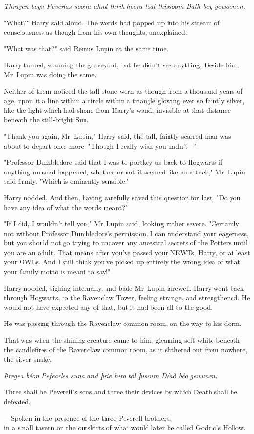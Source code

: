\emph{Thrayen beyn Peverlas soona ahnd thrih heera toal thissoom Dath bey
yewoonen.}

"What?" Harry said aloud. The words had popped up into his stream of
consciousness as though from his own thoughts, unexplained.

"What was that?" said Remus Lupin at the same time.

Harry turned, scanning the graveyard, but he didn't see anything. Beside him,
Mr~Lupin was doing the same.

Neither of them noticed the tall stone worn as though from a thousand years of
age, upon it a line within a circle within a triangle glowing ever so faintly
silver, like the light which had shone from Harry's wand, invisible at that
distance beneath the still-bright Sun.

"Thank you again, Mr~Lupin," Harry said, the tall, faintly scarred man was
about to depart once more. "Though I really wish you hadn't---"

"Professor Dumbledore said that I was to portkey us back to Hogwarts if
anything unusual happened, whether or not it seemed like an attack," Mr~Lupin
said firmly. "Which is eminently sensible."

Harry nodded. And then, having carefully saved this question for last, "Do you
have any idea of what the words meant?"

"If I did, I wouldn't tell you," Mr~Lupin said, looking rather severe.
"Certainly not without Professor Dumbledore's permission. I can understand your
eagerness, but you should not go trying to uncover any ancestral secrets of the
Potters until you are an adult. That means after you've passed your NEWTs,
Harry, or at least your OWLs. And I still think you've picked up entirely the
wrong idea of what your family motto is meant to say!"

Harry nodded, sighing internally, and bade Mr~Lupin farewell.
\later
Harry went back through Hogwarts, to the Ravenclaw Tower, feeling strange, and
strengthened. He would not have expected any of that, but it had been all to
the good.

He was passing through the Ravenclaw common room, on the way to his dorm.

That was when the shining creature came to him, gleaming soft white beneath the
candlefires of the Ravenclaw common room, as it slithered out from nowhere, the
silver snake.
\later
\begin{center}
\emph{Þregen béon Pefearles suna and þrie hira
tól þissum Déað béo gewunen.}

Three shall be Peverell's sons and three their devices by which Death shall be
defeated.

---Spoken in the presence of the three Peverell brothers,\\
in a small tavern on the outskirts of what would later be called Godric's
Hollow.
\end{center}
